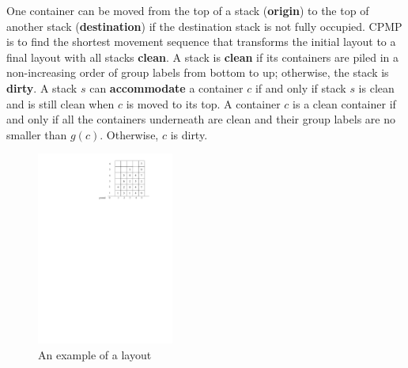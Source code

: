 \documentclass[review,3p,times,authoryear,12pt]{elsarticle}
\begin{document}
One container can be moved from the top of a stack (\textbf{origin}) to the top of another stack (\textbf{destination}) if the destination stack is not fully occupied.
CPMP is to find the shortest movement sequence that transforms the initial layout to a final layout with all stacks \textbf{clean}. A stack is \textbf{clean} if its containers are piled in a non-increasing order of group labels from bottom to up; otherwise, the stack is \textbf{dirty}. A stack $s$ can \textbf{accommodate} a container $c$ if and only if stack $s$ is clean and is still clean when $c$ is moved to its top.
A container $c$ is a clean container if and only if all the containers underneath are clean and their group labels are no smaller than $g(c)$. Otherwise, $c$ is dirty.


\begin{figure}[htbp]
\centering
\includegraphics[width=0.4\textwidth]{fig3.pdf}
\caption{An example of a layout}
\label{fig3}
\end{figure}

\end{document}
